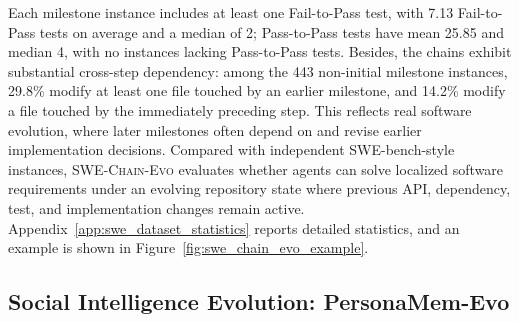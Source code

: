 \documentclass{article}
\begin{document}
Each milestone instance includes at least one Fail-to-Pass test, with 7.13 Fail-to-Pass tests on average and a median of 2; Pass-to-Pass tests have mean 25.85
and median 4, with no instances lacking Pass-to-Pass tests. Besides, the chains exhibit substantial cross-step dependency: among the 443 non-initial milestone
instances, 29.8\% modify at least one file touched by an earlier milestone, and 14.2\% modify a file touched by the immediately preceding step. 
This reflects real
software evolution, where later milestones often depend on and revise earlier implementation decisions. Compared with independent SWE-bench-style instances,
\textsc{SWE-Chain-Evo} evaluates whether agents can solve localized software requirements under an evolving repository state where previous API, dependency,
test, and implementation changes remain active. Appendix~\ref{app:swe_dataset_statistics} reports detailed statistics, and an example is shown in
Figure~\ref{fig:swe_chain_evo_example}.















    













































\subsection{Social Intelligence Evolution: PersonaMem-Evo}
\label{sec:personamem_evo}
\end{document}
